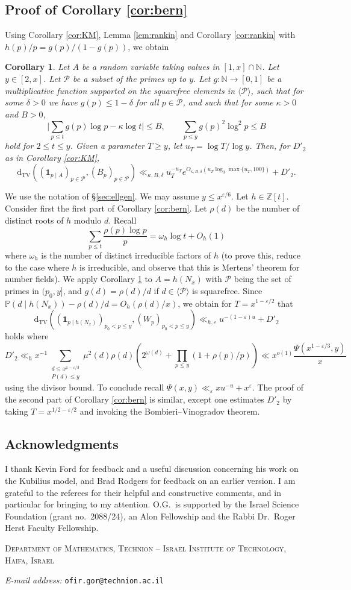 \documentclass{article}
\makeatletter
\newcommand{\Addresses}{{
		\bigskip
		\footnotesize
		
		\textsc{Department of Mathematics, Technion -- Israel Institute of Technology, Haifa, Israel}\par\nopagebreak
		\textit{E-mail address:} \texttt{ofir.gor@technion.ac.il}

}}
\theoremstyle{plain}
\newtheorem{cor}[thm]{Corollary}
\theoremstyle{remark}
\newcommand{\PP}{\mathbb{P}}
\newcommand{\ZZ}{\mathbb{Z}}
\newcommand{\NN}{\mathbb{N}}
\newcommand{\Pa}{\mathcal{P}}
\newcommand{\dtv}{\mathrm{d}_{\mathrm{TV}}}
\numberwithin{equation}{section}
\makeatother
\begin{document}
\subsection{Proof of Corollary \ref{cor:bern}}
Using Corollary \ref{cor:KM}, Lemma \ref{lem:rankin} and Corollary \ref{cor:rankin} with $h(p)/p=g(p)/(1-g(p))$, we obtain
\begin{cor}\label{cor:KMspec}
Let $A$ be a random variable  taking values in $[1,x]\cap \NN$. Let $y\in [2,x]$. Let $\Pa$ be a subset of the primes up to $y$. Let $g\colon \NN\to [0,1]$ be a multiplicative function supported on the squarefree elements in $\langle \Pa \rangle$, such that for some $\delta>0$ we have $g(p) \le 1-\delta$ for all $p\in \Pa$, and such that for some $\kappa>0$ and $B>0$, 
\[ \bigg|\sum_{p\le t} g(p)\log p-\kappa \log t \bigg|\le B, \qquad \sum_{p\le y}g(p)^2\log^2 p\le B\]
hold for $2 \le t \le y$. Given a parameter $T \ge y$, let $u_T=\log T/\log y$.  Then, for $D'_2$ as in Corollary \ref{cor:KM},
\[	\dtv( (\mathbf{1}_{p\mid A})_{p\in\Pa}, (B_p)_{p\in \Pa}) \ll_{\kappa,B,\delta} u_T^{-u_T}e^{O_{\kappa,B,\delta}(u_T\log_3 \max\{u_T,100\})}+D'_2.\]
\end{cor}
We use the notation of \S\ref{sec:ellgen}. We may assume $y\le x^{\varepsilon/6}$. Let $h\in \ZZ[t]$. Consider first the first part of Corollary \ref{cor:bern}. Let $\rho(d)$ be the number of distinct roots of $h$ modulo $d$. Recall
\[ \sum_{p \le t}\frac{\rho(p)\log p}{p} = \omega_h \log t + O_h(1)\]
where $\omega_h$ is the number of distinct irreducible factors of $h$ (to prove this, reduce to the case where $h$ is irreducible, and observe that this is Mertens' theorem for number fields). We apply Corollary \ref{cor:KMspec} to $A=h(N_x)$ with $\Pa$ being the set of primes in $(p_0,y]$, and $g(d)=\rho(d)/d$ if $d\in  \langle \Pa \rangle$ is squarefree. Since $\PP(d \mid h(N_x))-\rho(d)/d=O_{h}(\rho(d)/x)$, we obtain for $T=x^{1-\varepsilon/2}$ that
\[		\dtv( (\mathbf{1}_{p\mid h(N_x)})_{p_0<p\le y}, (W_p)_{p_0<p\le y})\ll_{h,\varepsilon}  u^{-(1-\varepsilon)u}+D'_2 \]
holds where
\[	D'_2 \ll_h  x^{-1}\sum_{\substack{d\le x^{1-\varepsilon/3}\\ P(d)\le y}}\mu^2(d)\rho(d)(2^{\omega(d)}+\prod_{p\le y}(1+\rho(p)/p))\ll x^{o(1)}\frac{\Psi(x^{1-\varepsilon/3},y)}{x} \]
using the divisor bound. To conclude recall $\Psi(x,y)\ll_{\varepsilon} xu^{-u}+x^{\varepsilon}$. The proof of the second part of Corollary \ref{cor:bern} is similar, except one estimates $D'_2$ by taking $T=x^{1/2-\varepsilon/2}$ and invoking the Bombieri--Vinogradov theorem.
\subsection*{Acknowledgments}
I thank Kevin Ford for feedback and a useful discussion concerning his work on the Kubilius model, and Brad Rodgers for feedback on an earlier version. I am grateful to the referees for their helpful and constructive comments, and in particular for bringing \cite{Brownian} to my attention. O.G.~is supported by the Israel Science Foundation (grant no.~2088/24), an Alon Fellowship and the Rabbi Dr.~Roger Herst Faculty Fellowship.




\Addresses
\end{document}
